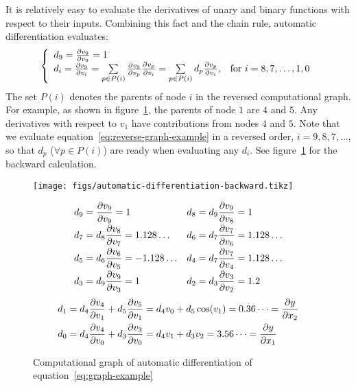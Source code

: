 It is relatively easy to evaluate the derivatives of unary and binary functions with respect to their inputs.
Combining this fact and the chain rule, automatic differentiation evaluates:
\begin{equation}\label{eq:reverse-graph-example}
    \left\{
        \begin{array}{ll}
            d_9 = \frac{\partial v_9}{\partial v_9} = 1 & \\
            d_i = \frac{\partial v_9}{\partial v_i}
                = \sum\limits_{p\in P(i)}\frac{\partial v_9}{\partial v_p}\frac{\partial v_p}{\partial v_i}
                = \sum\limits_{p\in P(i)}d_p\frac{\partial v_p}{\partial v_i}, & \text{for }i=8, 7, \ldots, 1, 0
        \end{array}
    \right.
\end{equation}
The set $P(i)$ denotes the parents of node $i$ in the reversed computational graph.
For example, as shown in figure~\ref{fig:automatic-differentiation-backward}, the parents of node $1$ are $4$ and $5$.
Any derivatives with respect to $v_1$ have contributions from nodes $4$ and $5$.
Note that we evaluate equation~\ref{eq:reverse-graph-example} in a reversed order, $i=9, 8, 7, \ldots$, so that $d_p$ ($\forall p\in P(i)$) are ready when evaluating any $d_i$.
See figure~\ref{fig:automatic-differentiation-backward} for the backward calculation.
\begin{figure}[hbt!]
    \begin{minipage}{0.4\textwidth}
        \texttt{[image: figs/automatic-differentiation-backward.tikz]}
    \end{minipage}%
    \begin{minipage}{0.5\textwidth}
        \scriptsize
        \singlespacing
        \begin{equation*}
            \begin{aligned}
                d_9& = \frac{\partial v_9}{\partial v_9} = 1 & d_8& = d_9 \frac{\partial v_9}{\partial v_8} = 1 \\[-2pt]
                d_7& = d_8 \frac{\partial v_8}{\partial v_7} = 1.128\dots & d_6& = d_7 \frac{\partial v_7}{\partial v_6} = 1.128\dots \\[-2pt]
                d_5& = d_6 \frac{\partial v_6}{\partial v_5} = -1.128\dots & d_4& = d_7 \frac{\partial v_7}{\partial v_4} = 1.128\dots \\[-2pt]
                d_3& = d_9 \frac{\partial v_9}{\partial v_3} = 1 & d_2& = d_3 \frac{\partial v_3}{\partial v_2} = 1.2
            \end{aligned}
        \end{equation*}%
        \begin{equation*}
            \begin{aligned}
                d_1& = d_4 \frac{\partial v_4}{\partial v_1} + d_5 \frac{\partial v_5}{\partial v_1} = d_4v_0 + d_5\cos(v_1) = 0.36\dots = \frac{\partial y}{\partial x_2} \\
                d_0& = d_4 \frac{\partial v_4}{\partial v_0} + d_3 \frac{\partial v_3}{\partial v_0} = d_4v_1+d_3v_2 = 3.56\dots = \frac{\partial y}{\partial x_1}
            \end{aligned}
        \end{equation*}
    \end{minipage}
    \caption{Computational graph of automatic differentiation of equation~\ref{eq:graph-example}}%
    \label{fig:automatic-differentiation-backward}
\end{figure}

